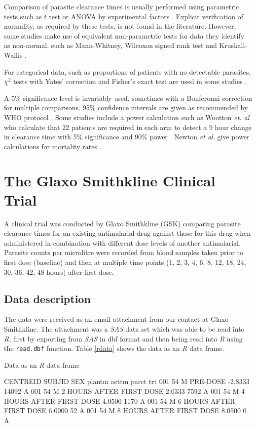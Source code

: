 Comparison of parasite clearance times is usually performed using parametric tests such as $t$ test or ANOVA by experimental factors \cite{smithuis, vries, wootton, carmello}. Explicit verification of normality, as required by these tests, is not found in the literature. However, some studies make use of equivalent non-parametric tests for data they identify as non-normal, such as Mann-Whitney, Wilcoxon signed rank test \cite{newton, carmello} and Kruskall-Wallis \cite{pukri}.\label{stat-tests}

For categorical data, such as proportions of patients with no detectable parasites, $\chi^{2}$ tests with Yates' correction and Fisher's exact test are used in some studies \cite{smithuis, newton}.

A 5\% significance level is invariably used, sometimes with a Bonferonni correction for multiple comparisons. 95\% confidence intervals are given as recommended by WHO protocol \cite{protocolWHO}. Some studies include a power calculation such as Wootton \textit{et. al} who calculate that 22 patients are required in each arm to detect a 9 hour change in clearance time with 5\% significance and 90\% power \cite{wootton}. Newton \textit{et al.} give power calculations for mortality rates \cite{newton}.

\section{The Glaxo Smithkline Clinical Trial}
A clinical trial was conducted by Glaxo Smithkline (GSK) comparing parasite clearance times for an existing antimalarial drug against those for this drug when administered in combination with different dose levels of another antimalarial. Parasite counts per microlitre were recorded from blood samples taken prior to first dose (baseline) and then at multiple time points (1, 2, 3, 4, 6, 8, 12, 18, 24, 30, 36, 42, 48 hours) after first dose.

\subsection{Data description}
The data were received as an email attachment from our contact at Glaxo Smithkline. The attachment was a \emph{SAS} data set which was able to be read into \emph{R}, first by exporting from \emph{SAS} in dbf format and then being read into \emph{R} using the \texttt{read.dbf} function.
Table \ref{rdata} shows the data as an \emph{R} data frame. 
\begin{table}[h]
\centering
\caption{Data as an \emph{R} data frame}\label{rdata}
\begin{boxedverbatim}
CENTREID SUBJID SEX                    plantm   acttm  parct trt
     001     54   M                  PRE-DOSE -2.8333  14092   A  
     001     54   M  2 HOURS AFTER FIRST DOSE  2.0333   7592   A  
     001     54   M  4 HOURS AFTER FIRST DOSE  4.0500   1170   A  
     001     54   M  6 HOURS AFTER FIRST DOSE  6.0000     52   A  
     001     54   M  8 HOURS AFTER FIRST DOSE  8.0500      0   A  
\end{boxedverbatim}
\end{table}

